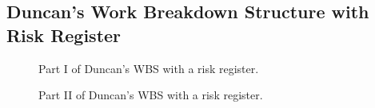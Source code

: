 \documentclass[12pt]{article}
\begin{document}
\subsection{Duncan's Work Breakdown Structure with Risk Register}
\begin{figure}[ht]
    \centering
    \caption{Part I of Duncan's WBS with a risk register.}
    \label{fig:WBS1}
\end{figure}
\newpage
\begin{figure}[ht]
    \centering
    \caption{Part II of Duncan's WBS with a risk register.}
    \label{fig:WBS2}
\end{figure}
\newpage
\end{document}
